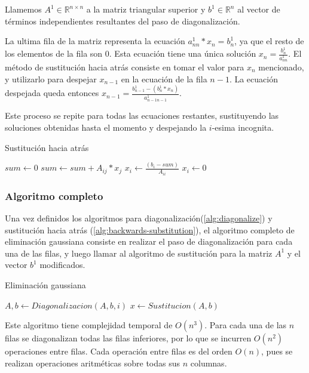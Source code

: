 Llamemos $A^{1} \in \mathbb{R}^{n \times n}$ a la matriz triangular superior y $b^{1} \in \mathbb{R}^{n}$ al vector de términos independientes resultantes del paso de diagonalización.

La ultima fila de la matriz representa la ecuación $a^{1}_{nn} * x_{n} = b^{1}_{n}$, ya que el resto de los elementos de la fila son $0$. Esta ecuación tiene una única solución $x_{n} = \frac{b^{1}_{n}}{a^{1}_{nn}}$. El método de sustitución hacia atrás consiste en tomar el valor para $x_{n}$ mencionado, y utilizarlo para despejar $x_{n-1}$ en la ecuación de la fila $n - 1$. La ecuación despejada queda entonces $x_{n - 1} = \frac{b^{1}_{n - 1} - (b^{1}_{n} * x_{n})}{a^{1}_{n-1n-1}}$.

Este proceso se repite para todas las ecuaciones restantes, sustituyendo las soluciones obtenidas hasta el momento y despejando la $i$-esima incognita.

\begin{algorithm}
    \caption{Sustitución hacia atrás}\label{alg:backwards-substitution}
    \begin{algorithmic}
        \State $sum \gets 0$
        \State $sum \gets sum + A_{ij} * x_{j}$
        \EndFor
        \State $x_{i} \gets \frac{(b_{i} - sum)}{A_{ii}}$
        \Else
        \State $x_{i} \gets 0$ 
        \EndIf
        \EndFor
    \end{algorithmic}
\end{algorithm}

\subsubsection*{Algoritmo completo}

Una vez definidos los algoritmos para diagonalización(\ref{alg:diagonalize}) y sustitución hacia atrás (\ref{alg:backwards-substitution}), el algoritmo completo de eliminación gaussiana consiste en realizar el paso de diagonalización para cada una de las filas, y luego llamar al algoritmo de sustitución para la matriz $A^{1}$ y el vector $b^{1}$ modificados.

\begin{algorithm}
    \caption{Eliminación gaussiana}\label{alg:gauss}
    \begin{algorithmic}
        \State $A, b \gets Diagonalizacion(A, b, i)$ 
        \EndFor
        \State $x \gets Sustitucion(A,b)$ 
    \end{algorithmic}
\end{algorithm}

Este algoritmo tiene complejidad temporal de $O(n^{3})$. Para cada una de las $n$ filas se diagonalizan todas las filas inferiores, por lo que se incurren $O(n^{2})$ operaciones entre filas. Cada operación entre filas es del orden $O(n)$, pues se realizan operaciones aritméticas sobre todas sus $n$ columnas.
